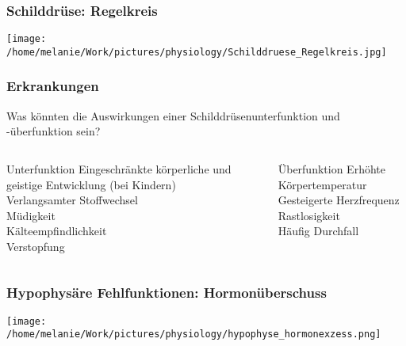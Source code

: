 \documentclass{beamer}
\begin{document}
\begin{frame}
\frametitle{Schilddrüse: Regelkreis}

\begin{center}
\texttt{[image: /home/melanie/Work/pictures/physiology/Schilddruese\_Regelkreis.jpg]}
\end{center}


\end{frame}




\begin{frame}
\frametitle{Erkrankungen}

Was könnten die Auswirkungen einer Schilddrüsenunterfunktion und -überfunktion sein?

\pause

\begin{columns}[t]
\begin{column}{5cm}
\begin{block}{Unterfunktion}
Eingeschränkte körperliche und geistige Entwicklung (bei Kindern)\\
Verlangsamter Stoffwechsel \\
Müdigkeit \\
Kälteempfindlichkeit \\
Verstopfung
\end{block}
\end{column}

\begin{column}{5cm}
\begin{block}{Überfunktion}
Erhöhte Körpertemperatur \\
Gesteigerte Herzfrequenz \\
Rastlosigkeit \\
Häufig Durchfall 
\end{block}
\end{column}

\end{columns}

\end{frame}


\begin{frame}
\frametitle{Hypophysäre Fehlfunktionen: Hormonüberschuss}

\begin{center}
\texttt{[image: /home/melanie/Work/pictures/physiology/hypophyse\_hormonexzess.png]}
\end{center}

\end{frame}
\end{document}
